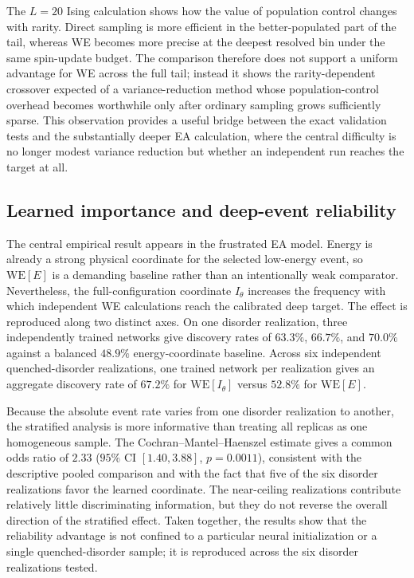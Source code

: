\documentclass[a4paper,fleqn]{cas-sc}
\newcommand{\WE}{\mathrm{WE}}
\begin{document}
The $L=20$ Ising calculation shows how the value of population control changes with rarity.
Direct sampling is more efficient in the better-populated part of the tail, whereas WE becomes
more precise at the deepest resolved bin under the same spin-update budget. The comparison
therefore does not support a uniform advantage for WE across the full tail; instead it shows the
rarity-dependent crossover expected of a variance-reduction method whose population-control
overhead becomes worthwhile only after ordinary sampling grows sufficiently sparse. This
observation provides a useful bridge between the exact validation tests and the substantially
deeper EA calculation, where the central difficulty is no longer modest variance reduction but
whether an independent run reaches the target at all.

\subsection{Learned importance and deep-event reliability}\label{sec:whymatters}
The central empirical result appears in the frustrated EA model. Energy is already a strong
physical coordinate for the selected low-energy event, so $\WE[E]$ is a demanding baseline
rather than an intentionally weak comparator. Nevertheless, the full-configuration coordinate
$I_\theta$ increases the frequency with which independent WE calculations reach the calibrated
deep target. The effect is reproduced along two distinct axes. On one disorder realization,
three independently trained networks give discovery rates of $63.3\%$, $66.7\%$, and $70.0\%$
against a balanced $48.9\%$ energy-coordinate baseline. Across six independent quenched-disorder
realizations, one trained network per realization gives an aggregate discovery rate of $67.2\%$
for $\WE[I_\theta]$ versus $52.8\%$ for $\WE[E]$.

Because the absolute event rate varies from one disorder realization to another, the
stratified analysis is more informative than treating all replicas as one homogeneous sample.
The Cochran--Mantel--Haenszel estimate gives a common odds ratio of $2.33$ ($95\%$ CI
$[1.40,3.88]$, $p=0.0011$), consistent with the descriptive pooled comparison and with the
fact that five of the six disorder realizations favor the learned coordinate. The near-ceiling
realizations contribute relatively little discriminating information, but they do not reverse
the overall direction of the stratified effect. Taken together, the results show that the
reliability advantage is not confined to a particular neural initialization or a single
quenched-disorder sample; it is reproduced across the six disorder realizations tested.
\end{document}

